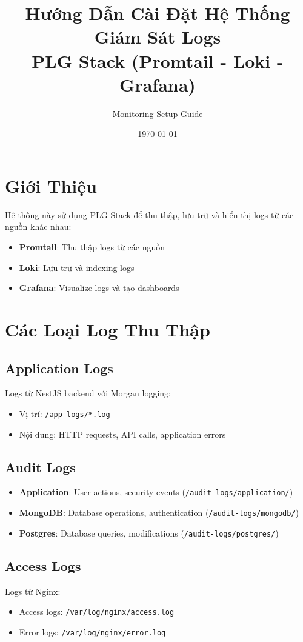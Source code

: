 \documentclass[a4paper,12pt]{article}
\title{Hướng Dẫn Cài Đặt Hệ Thống Giám Sát Logs \\
       \Large PLG Stack (Promtail - Loki - Grafana)}
\author{Monitoring Setup Guide}
\date{\today}
\begin{document}
\maketitle
\tableofcontents
\newpage

\section{Giới Thiệu}

Hệ thống này sử dụng PLG Stack để thu thập, lưu trữ và hiển thị logs từ các nguồn khác nhau:

\begin{itemize}
    \item \textbf{Promtail}: Thu thập logs từ các nguồn
    \item \textbf{Loki}: Lưu trữ và indexing logs
    \item \textbf{Grafana}: Visualize logs và tạo dashboards
\end{itemize}

\section{Các Loại Log Thu Thập}

\subsection{Application Logs}
Logs từ NestJS backend với Morgan logging:
\begin{itemize}
    \item Vị trí: \texttt{/app-logs/*.log}
    \item Nội dung: HTTP requests, API calls, application errors
\end{itemize}

\subsection{Audit Logs}
\begin{itemize}
    \item \textbf{Application}: User actions, security events (\texttt{/audit-logs/application/})
    \item \textbf{MongoDB}: Database operations, authentication (\texttt{/audit-logs/mongodb/})
    \item \textbf{Postgres}: Database queries, modifications (\texttt{/audit-logs/postgres/})
\end{itemize}

\subsection{Access Logs}
Logs từ Nginx:
\begin{itemize}
    \item Access logs: \texttt{/var/log/nginx/access.log}
    \item Error logs: \texttt{/var/log/nginx/error.log}
\end{itemize}
\end{document}
